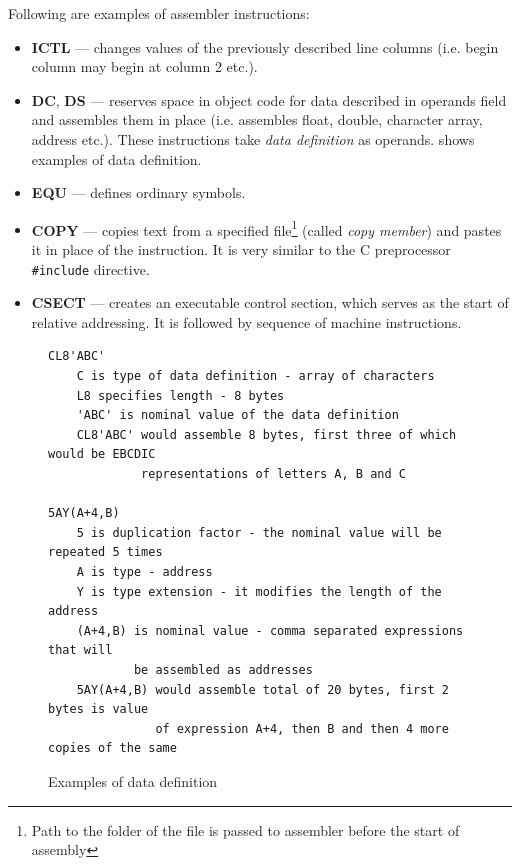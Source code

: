 Following are examples of assembler instructions:
\begin{itemize}
	\item \textbf{ICTL} --- changes values of the previously described line columns (i.e. begin column may begin at column 2 etc.).
	
	\item \textbf{DC}, \textbf{DS} --- reserves space in object code for data described in operands field and assembles them in place (i.e. assembles float, double, character array, address etc.). These instructions take \emph{data definition} as operands.  shows examples of data definition.
	
	\item \textbf{EQU} --- defines ordinary symbols.
	
	\item \textbf{COPY} --- copies text from a specified file\footnote{Path to the folder of the file is passed to assembler before the start of assembly} (called \emph{copy member}) and pastes it in place of the instruction. It is very similar to the C preprocessor \texttt{\#include} directive.
	
	\item \textbf{CSECT} --- creates an executable control section, which serves as the start of relative addressing. It is followed by sequence of machine instructions.
\end{itemize}

\begin{figure}[t]
	\begin{verbatim}
CL8'ABC'
    C is type of data definition - array of characters
    L8 specifies length - 8 bytes
    'ABC' is nominal value of the data definition
    CL8'ABC' would assemble 8 bytes, first three of which would be EBCDIC
             representations of letters A, B and C

5AY(A+4,B)
    5 is duplication factor - the nominal value will be repeated 5 times
    A is type - address
    Y is type extension - it modifies the length of the address
    (A+4,B) is nominal value - comma separated expressions that will
            be assembled as addresses
    5AY(A+4,B) would assemble total of 20 bytes, first 2 bytes is value
               of expression A+4, then B and then 4 more copies of the same
	\end{verbatim}
	\caption{Examples of data definition}
	\label{data_def_example}
\end{figure}

